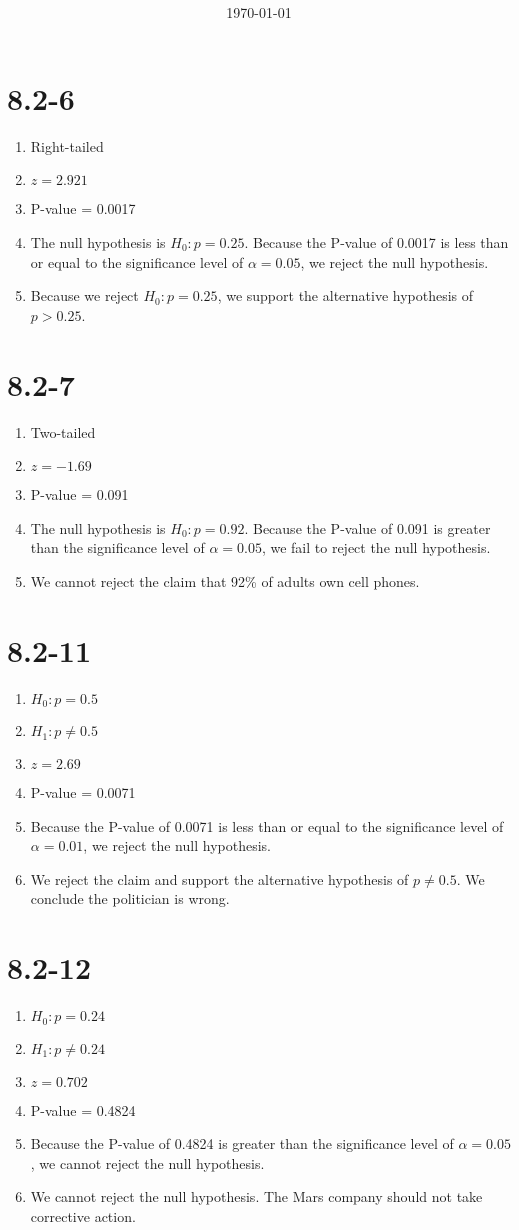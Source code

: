 \documentclass[12pt,fleqn]{article}
\title{\classdescription\ \\ \classname\ \\ $\ $ \\ \assignment}
\author{\authorname}
\date{\today}
\newcommand{\chapter}{8.2}
\newcommand{\problem}[1]{\vspace{5ex}\section*{\chapter-#1}}
\begin{document}
\maketitle


\problem{6}
\begin{enumerate}[label=\alph*.]
\item Right-tailed
\item $z = 2.921$
\item P-value = 0.0017
\item The null hypothesis is $H_0: p = 0.25$. Because the P-value of 0.0017 is less than or equal to the significance level of $\alpha = 0.05$, we reject the null hypothesis.
\item Because we reject $H_0: p = 0.25$, we support the alternative hypothesis of $p > 0.25$.
\end{enumerate}

\problem{7}
\begin{enumerate}[label=\alph*.]
\item Two-tailed
\item $z = -1.69$
\item P-value = 0.091
\item The null hypothesis is $H_0: p = 0.92$. Because the P-value of 0.091 is greater than the significance level of $\alpha = 0.05$, we fail to reject the null hypothesis.
\item We cannot reject the claim that 92\% of adults own cell phones.
\end{enumerate}


\problem{11}
\begin{enumerate}[label=\alph*.]
\item $H_0: p = 0.5$
\item $H_1: p \ne 0.5$
\item $z = 2.69$
\item P-value = 0.0071
\item Because the P-value of 0.0071 is less than or equal to the significance level of $\alpha = 0.01$, we reject the null hypothesis.
\item We reject the claim and support the alternative hypothesis of $p \ne 0.5$. We conclude the politician is wrong.
\end{enumerate}


\problem{12}
\begin{enumerate}[label=\alph*.]
\item $H_0: p = 0.24$
\item $H_1: p \ne 0.24$
\item $z = 0.702$
\item P-value = 0.4824
\item Because the P-value of 0.4824 is greater than the significance level of $\alpha = 0.05$, we cannot reject the null hypothesis.
\item We cannot reject the null hypothesis. The Mars company should not take corrective action.
\end{enumerate}
\end{document}
